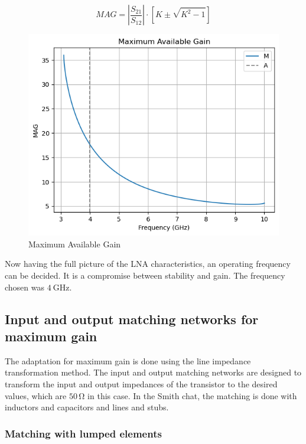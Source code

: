 \begin{equation}
    MAG = \left | \frac{S_{21}}{S_{12}} \right |\cdot \left[ K \pm \sqrt{K^2-1} \right]
    \label{eq:MAG}
\end{equation}

\begin{figure}[H]
    \centering
    \includegraphics*[scale = 0.5]{Images/MAG.png}
    \caption{Maximum Available Gain }
    \label{fig:MAG}
\end{figure}

Now having the full picture of the LNA characteristics, an operating frequency can be decided. It is a compromise between stability and gain. The frequency chosen was $\SI{4}{\giga\hertz}$.


\subsection{Input and output matching networks for maximum gain}

The adaptation for maximum gain is done using the line impedance transformation method. The input and output matching networks are designed to transform the input and output impedances of the transistor to the desired values, which are $50\,\si{\ohm}$ in this case. In the Smith chat, the matching is done with inductors and capacitors and lines and stubs.

\subsubsection{Matching with lumped elements}

